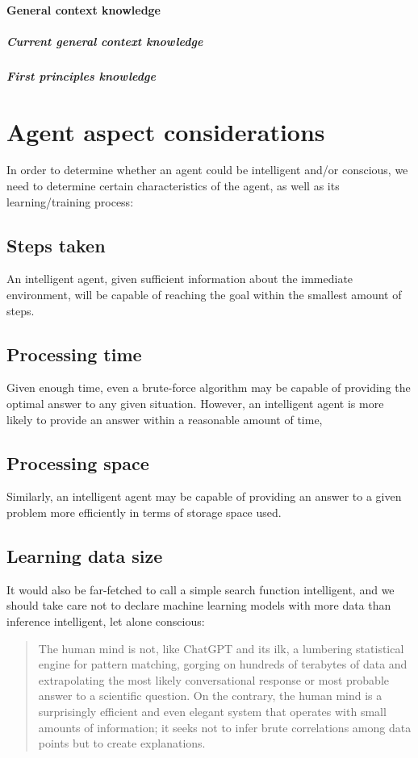 \documentclass[masterthesis]{fer}
\begin{document}
\paragraph{General context knowledge}
\subparagraph{Current general context knowledge}
\subparagraph{First principles knowledge}


\section{Agent aspect considerations}
In order to determine whether an agent could be intelligent and/or conscious, we need to determine certain characteristics of the agent, as well as its learning/training process:
\subsection{Steps taken}
An intelligent agent, given sufficient information about the immediate environment, will be capable of reaching the goal within the smallest amount of steps.
\subsection{Processing time}
Given enough time, even a brute-force algorithm may be capable of providing the optimal answer to any given situation. However, an intelligent agent is more likely to provide an answer within a reasonable amount of time, 
\subsection{Processing space}
Similarly, an intelligent agent may be capable of providing an answer to a given problem more efficiently in terms of storage space used.
\subsection{Learning data size}
It would also be far-fetched to call a simple search function intelligent, and we should take care not to declare machine learning models with more data than inference intelligent, let alone conscious:
\begin{quote}
The human mind is not, like ChatGPT and its ilk, a lumbering statistical engine for pattern matching, gorging on hundreds of terabytes of data and extrapolating the most likely conversational response or most probable answer to a scientific question. On the contrary, the human mind is a surprisingly efficient and even elegant system that operates with small amounts of information; it seeks not to infer brute correlations among data points but to create explanations. 
\end{quote}
\end{document}
